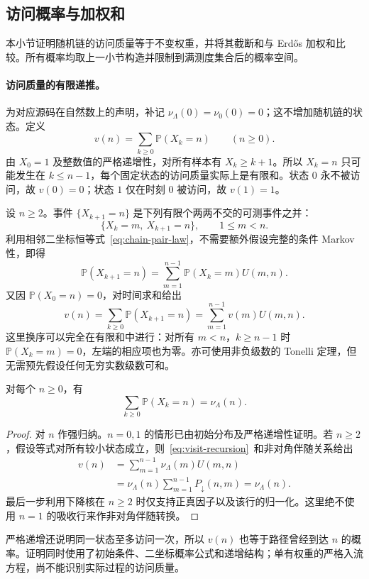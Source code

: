 \subsection{访问概率与加权和}
本小节证明随机链的访问质量等于不变权重，并将其截断和与 Erd\H{o}s 加权和比较。所有概率均取上一小节构造并限制到满测度集合后的概率空间。

\paragraph{访问质量的有限递推。}
为对应源码在自然数上的声明，补记 $\nu_\Lambda(0)=\nu_0(0)=0$；这不增加随机链的状态。定义
\[
 v(n)=\sum_{k\ge0}\mathbb P(X_k=n)\qquad(n\ge0).
\]
由 $X_0=1$ 及整数值的严格递增性，对所有样本有 $X_k\ge k+1$。所以 $X_k=n$ 只可能发生在 $k\le n-1$，每个固定状态的访问质量实际上是有限和。状态 $0$ 永不被访问，故 $v(0)=0$；状态 $1$ 仅在时刻 $0$ 被访问，故 $v(1)=1$。

设 $n\ge2$。事件 $\{X_{k+1}=n\}$ 是下列有限个两两不交的可测事件之并：
\[
 \{X_k=m,\ X_{k+1}=n\},\qquad 1\le m<n.
\]
利用相邻二坐标恒等式~\eqref{eq:chain-pair-law}，不需要额外假设完整的条件 Markov 性，即得
\[
 \mathbb P(X_{k+1}=n)
 =\sum_{m=1}^{n-1}\mathbb P(X_k=m)U(m,n).
\]
又因 $\mathbb P(X_0=n)=0$，对时间求和给出
\begin{equation}\label{eq:visit-recursion}
 v(n)=\sum_{k\ge0}\mathbb P(X_{k+1}=n)
     =\sum_{m=1}^{n-1}v(m)U(m,n).
\end{equation}
这里换序可以完全在有限和中进行：对所有 $m<n$，$k\ge n-1$ 时 $\mathbb P(X_k=m)=0$，左端的相应项也为零。亦可使用非负级数的 Tonelli 定理，但无需预先假设任何无穷实数级数可和。

\begin{proposition}[访问概率恒等式]\label{prop:visit-identity}
对每个 $n\ge0$，有
\begin{equation}\label{eq:visit-goal}
 \boxed{\sum_{k\ge0}\mathbb P(X_k=n)=\nu_\Lambda(n).}
\end{equation}
\end{proposition}
\begin{proof}
对 $n$ 作强归纳。$n=0,1$ 的情形已由初始分布及严格递增性证明。若 $n\ge2$，假设等式对所有较小状态成立，则~\eqref{eq:visit-recursion}~和非对角伴随关系给出
\begin{align*}
 v(n)&=\sum_{m=1}^{n-1}\nu_\Lambda(m)U(m,n)\\
 &=\nu_\Lambda(n)\sum_{m=1}^{n-1}P_\downarrow(n,m)
 =\nu_\Lambda(n).
\end{align*}
最后一步利用下降核在 $n\ge2$ 时仅支持正真因子以及该行的归一化。这里绝不使用 $n=1$ 的吸收行来作非对角伴随转换。
\end{proof}
严格递增还说明同一状态至多访问一次，所以 $v(n)$ 也等于路径曾经到达 $n$ 的概率。证明同时使用了初始条件、二坐标概率公式和递增结构；单有权重的严格入流方程，尚不能识别实际过程的访问质量。

